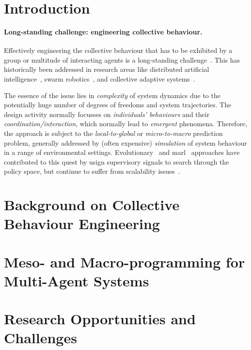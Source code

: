 \documentclass[sigconf,anonymous]{aamas}
\begin{document}
\section{Introduction}
\label{sec:intro}

\paragraph{Long-standing challenge: engineering collective behaviour.} Effectively engineering the collective behaviour 
  that has to be exhibited 
  by a group or multitude of 
  interacting agents
  is a long-standing challenge~\cite{readings-dai-1988,DBLP:journals/swarm/BrambillaFBD13,DBLP:journals/sttt/NicolaJW20,DBLP:journals/tosem/CasadeiAADPSTV25}.
%
This has historically been addressed  
  in research areas 
  like
  distributed artificial intelligence~\cite{readings-dai-1988}, 
  swarm robotics~\cite{DBLP:journals/swarm/BrambillaFBD13},
  and collective adaptive systems~\cite{DBLP:journals/sttt/NicolaJW20}.

The essence of the issue lies in \emph{complexity} of system dynamics 
  due to the potentially huge number of degrees of freedoms
  and system trajectories.
%
The design activity normally focusses on \emph{individuals' behaviours}
  and their \emph{coordination/interaction},
  which normally lead to \emph{emergent} phenomena.
%
Therefore, the approach is subject to the \emph{local-to-global} or \emph{micro-to-macro} prediction problem,
  generally addressed by (often expensive) \emph{simulation}
  of system behaviour in a range of environmental settings.
%
Evolutionary~\cite{} and \ac{marl}~\cite{Hou2025dml-swarm} approaches 
  have contributed to this quest
  by usign supervisory signals to search through the policy space, but continue to suffer from scalability issues~\cite{dingbang2024scalability-marl}.


\cite{DBLP:journals/csur/Casadei23}

\section{Background on Collective Behaviour Engineering}

\section{Meso- and Macro-programming for Multi-Agent Systems}

\section{Research Opportunities and Challenges}



 


\end{document}
